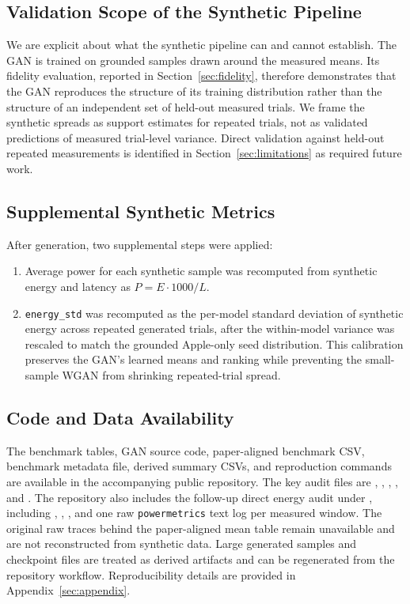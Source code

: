 \documentclass[conference]{IEEEtran}
\begin{document}
\subsection{Validation Scope of the Synthetic Pipeline}
We are explicit about what the synthetic pipeline can and cannot establish.
The GAN is trained on grounded samples drawn around the measured means. Its
fidelity evaluation, reported in Section~\ref{sec:fidelity}, therefore
demonstrates that the GAN reproduces the structure of its training
distribution rather than the structure of an independent set of held-out
measured trials. We frame the synthetic spreads as support estimates for
repeated trials, not as validated predictions of measured trial-level
variance. Direct validation against held-out repeated measurements is
identified in Section~\ref{sec:limitations} as required future work.

\subsection{Supplemental Synthetic Metrics}
After generation, two supplemental steps were applied:
\begin{enumerate}
\item Average power for each synthetic sample was recomputed from synthetic
energy and latency as $P = E \cdot 1000 / L$.
\item \texttt{energy\_std} was recomputed as the per-model standard deviation
of synthetic energy across repeated generated trials, after the within-model
variance was rescaled to match the grounded Apple-only seed distribution. This
calibration preserves the GAN's learned means and ranking while preventing the
small-sample WGAN from shrinking repeated-trial spread.
\end{enumerate}

\subsection{Code and Data Availability}
The benchmark tables, GAN source code, paper-aligned benchmark CSV, benchmark
metadata file, derived summary CSVs, and reproduction commands are available
in the accompanying public repository. The key audit files are
,
,
,
, and
. The repository also includes the follow-up
direct energy audit under , including
,
,
, and one raw
\texttt{powermetrics} text log per measured window. The original raw traces
behind the paper-aligned mean table remain unavailable and are not
reconstructed from synthetic data. Large generated samples and checkpoint
files are treated as derived artifacts and can be regenerated from the
repository workflow.
Reproducibility details are provided in Appendix~\ref{sec:appendix}.
\end{document}

